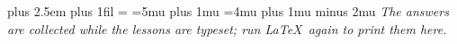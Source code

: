 \begin{fullwidth}
\small
\setlength{\parindent}{0pt}
\setlength{\columnsep}{7mm}
\setlength{\multicolsep}{0pt}
\setlength{\anem@anslabel}{4.1em}
\rightskip=0pt plus 2.5em \parfillskip=0pt plus 1fil \spaceskip=\font \xspaceskip=0pt
 
\thickmuskip=5mu plus 1mu \medmuskip=4mu plus 1mu minus 2mu %
  {}
  {\noindent\textit{The answers are collected while the lessons are typeset; run \LaTeX\ again to print them here.}}
\ifanem@anscols\anem@anscolsend\fi
\end{fullwidth}
\makeatother
